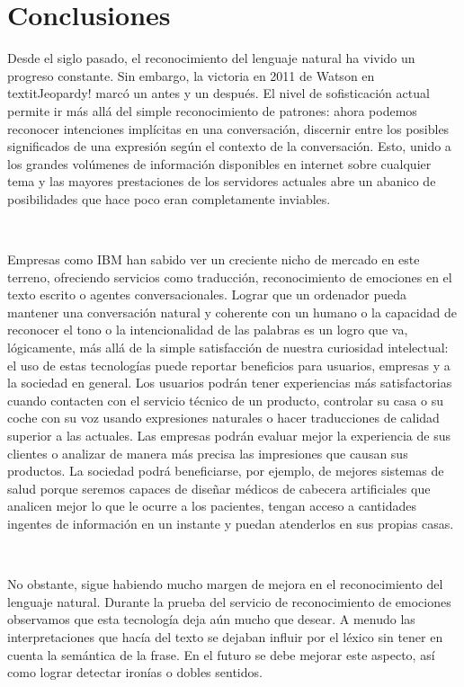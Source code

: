 \documentclass[paper=a4, fontsize=10pt]{scrartcl} %
\numberwithin{equation}{section} %
\numberwithin{figure}{section} %
\numberwithin{table}{section} %
\begin{document}
\section{Conclusiones}

Desde el siglo pasado, el reconocimiento del lenguaje natural ha vivido un progreso constante. Sin embargo, la victoria en 2011 de Watson en textit{Jeopardy!} marcó un antes y un después. El nivel de sofisticación actual permite ir más allá del simple reconocimiento de patrones: ahora podemos reconocer intenciones implícitas en una conversación, discernir entre los posibles significados de una expresión según el contexto de la conversación. Esto, unido a los grandes volúmenes de información disponibles en internet sobre cualquier tema y las mayores prestaciones de los servidores actuales abre un abanico de posibilidades que hace poco eran completamente inviables. 

\

Empresas como IBM han sabido ver un creciente nicho de mercado en este terreno, ofreciendo servicios como traducción, reconocimiento de emociones en el texto escrito o agentes conversacionales. Lograr que un ordenador pueda mantener una conversación natural y coherente con un humano o la capacidad de reconocer el tono o la intencionalidad de las palabras es un logro que va, lógicamente, más allá de la simple satisfacción de nuestra curiosidad intelectual: el uso de estas tecnologías puede reportar beneficios para usuarios, empresas y a la sociedad en general. Los usuarios podrán tener experiencias más satisfactorias cuando contacten con el servicio técnico de un producto, controlar su casa o su coche con su voz usando expresiones naturales o hacer traducciones de calidad superior a las actuales. Las empresas podrán evaluar mejor la experiencia de sus clientes o analizar de manera más precisa las impresiones que causan sus productos. La sociedad podrá beneficiarse, por ejemplo, de mejores sistemas de salud porque seremos capaces de diseñar médicos de cabecera artificiales que analicen mejor lo que le ocurre a los pacientes, tengan acceso a cantidades ingentes de información en un instante y puedan atenderlos en sus propias casas.

\

No obstante, sigue habiendo mucho margen de mejora en el reconocimiento del lenguaje natural. Durante la prueba del servicio de reconocimiento de emociones observamos que esta tecnología deja aún mucho que desear. A menudo las interpretaciones que hacía del texto se dejaban influir por el léxico sin tener en cuenta la semántica de la frase. En el futuro se debe mejorar este aspecto, así como lograr detectar ironías o dobles sentidos.
\end{document}
